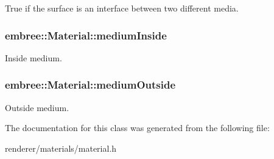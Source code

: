 True if the surface is an interface between two different media. 

\hypertarget{classembree_1_1_material_a02b33b77edd5fe04ce258e0eb72f175d}{
\subsubsection[{mediumInside}]{ {\bf embree::Material::mediumInside}}}
\label{classembree_1_1_material_a02b33b77edd5fe04ce258e0eb72f175d}


Inside medium. 

\hypertarget{classembree_1_1_material_af5c721cdded6b10003304fbc781f479b}{
\subsubsection[{mediumOutside}]{ {\bf embree::Material::mediumOutside}}}
\label{classembree_1_1_material_af5c721cdded6b10003304fbc781f479b}


Outside medium. 



The documentation for this class was generated from the following file:\begin{DoxyCompactItemize}
\item 
renderer/materials/material.h\end{DoxyCompactItemize}
